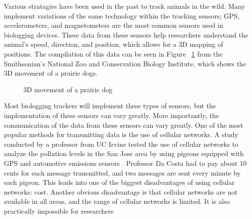 \documentclass[sigplan,screen,nonacm]{acmart}
\begin{document}
Various stratagies have been used in the past to track animals in the wild. Many
implement variations of the same technology within the tracking sensors;
GPS, accelerometers, and magnetometers are the most common sensors used in
biologging devices. These data from these sensors help researchers understand
the animal's  speed, direction, and position, which allows for a 3D mapping of
positions\cite{Kidangoor_2024}. The compilation of this data can be seen in Figure ~\ref{fig:prairie_dog_3D_movement}
from the Smithsonian's National Zoo and Conservation Biology Institute, which
shows the 3D movement of a prairie dogs.
\begin{figure}[htbp]
  \centering
  \caption{3D movement of a prairie dog}
  \label{fig:prairie_dog_3D_movement}
\end{figure}
Most biologging trackers will implement these types of sensors, but the
implementation of these sensors can vary greatly. More importantly, the
communication of the data from these sensors can vary greatly. One of the
most popular methods for transmitting data is the use of cellular networks.
A study conducted by a professor from UC Irvine tested the use of cellular
networks to analyze the pollution levels in the San Jose area by using pigeons
equipped with GPS and automotive emissions sensors \cite{Martin_2006}. Professor
Da Costa had to pay about 10 cents for each message transmitted, and two
messages are sent every minute by each pigeon\cite{Martin_2006}. This leads into one of the biggest
disadvantages of using cellular networks: cost. Another obvious disadvantage
is that cellular networks are not available in all areas, and the range of
cellular networks is limited. It is also practically impossible for researchers
\end{document}
